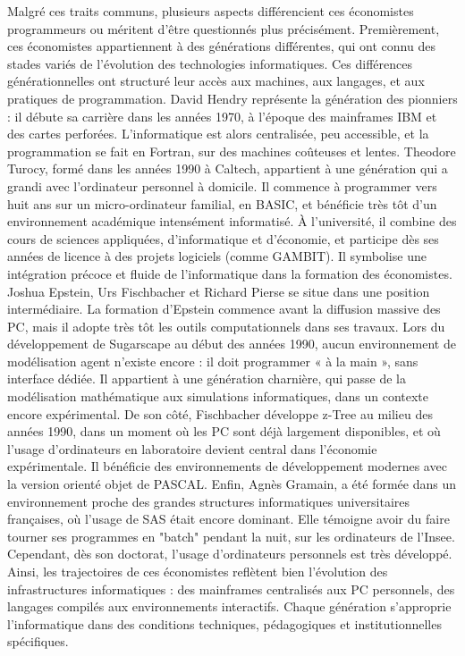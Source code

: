 Malgré ces traits communs, plusieurs aspects différencient ces économistes programmeurs ou méritent d’être questionnés plus précisément. Premièrement, ces économistes appartiennent à des générations différentes, qui ont connu des stades variés de l’évolution des technologies informatiques. Ces différences générationnelles ont structuré leur accès aux machines, aux langages, et aux pratiques de programmation. David Hendry représente la génération des pionniers : il débute sa carrière dans les années 1970, à l’époque des mainframes IBM et des cartes perforées. L’informatique est alors centralisée, peu accessible, et la programmation se fait en Fortran, sur des machines coûteuses et lentes. Theodore Turocy, formé dans les années 1990 à Caltech, appartient à une génération qui a grandi avec l’ordinateur personnel à domicile. Il commence à programmer vers huit ans sur un micro-ordinateur familial, en BASIC, et bénéficie très tôt d’un environnement académique intensément informatisé. À l’université, il combine des cours de sciences appliquées, d’informatique et d’économie, et participe dès ses années de licence à des projets logiciels (comme GAMBIT). Il symbolise une intégration précoce et fluide de l’informatique dans la formation des économistes. Joshua Epstein, Urs Fischbacher et Richard Pierse se situe dans une position intermédiaire. La formation d’Epstein commence avant la diffusion massive des PC, mais il adopte très tôt les outils computationnels dans ses travaux. Lors du développement de Sugarscape au début des années 1990, aucun environnement de modélisation agent n'existe encore : il doit programmer « à la main », sans interface dédiée. Il appartient à une génération charnière, qui passe de la modélisation mathématique aux simulations informatiques, dans un contexte encore expérimental. De son côté, Fischbacher développe z-Tree au milieu des années 1990, dans un moment où les PC sont déjà largement disponibles, et où l’usage d’ordinateurs en laboratoire devient central dans l’économie expérimentale. Il bénéficie des environnements de développement modernes avec la version orienté objet de PASCAL. Enfin, Agnès Gramain, a été formée dans un environnement proche des grandes structures informatiques universitaires françaises, où l’usage de SAS était encore dominant. Elle témoigne avoir du faire tourner ses programmes en "batch" pendant la nuit, sur les ordinateurs de l’Insee. Cependant, dès son doctorat, l’usage d’ordinateurs personnels est très développé. Ainsi, les trajectoires de ces économistes reflètent bien l’évolution des infrastructures informatiques : des mainframes centralisés aux PC personnels, des langages compilés aux environnements interactifs. Chaque génération s’approprie l’informatique dans des conditions techniques, pédagogiques et institutionnelles spécifiques.


